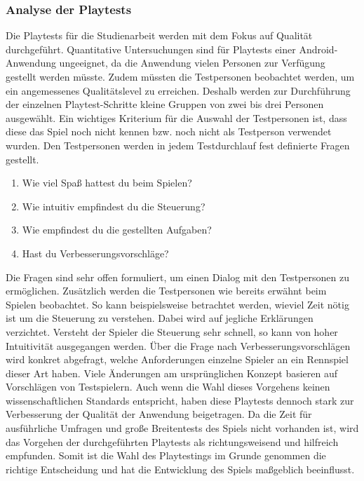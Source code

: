 \subsubsection*{Analyse der Playtests}
Die Playtests für die Studienarbeit werden mit dem Fokus auf Qualität durchgeführt. Quantitative Untersuchungen sind für Playtests einer Android-Anwendung ungeeignet, da die Anwendung vielen Personen zur Verfügung gestellt werden müsste. Zudem müssten die Testpersonen beobachtet werden, um ein angemessenes Qualitätslevel zu erreichen. Deshalb werden zur Durchführung der einzelnen Playtest-Schritte kleine Gruppen von zwei bis drei Personen ausgewählt. Ein wichtiges Kriterium für die Auswahl der Testpersonen ist, dass diese das Spiel noch nicht kennen bzw. noch nicht als Testperson verwendet wurden.
Den Testpersonen werden in jedem Testdurchlauf fest definierte Fragen gestellt.
\begin{enumerate}
    \item{Wie viel Spaß hattest du beim Spielen?}
    \item{Wie intuitiv empfindest du die Steuerung?}
    \item{Wie empfindest du die gestellten Aufgaben?}
    \item{Hast du Verbesserungsvorschläge?}
\end{enumerate}
Die Fragen sind sehr offen formuliert, um einen Dialog mit den Testpersonen zu ermöglichen. Zusätzlich werden die Testpersonen wie bereits erwähnt beim Spielen beobachtet. So kann beispielsweise betrachtet werden, wieviel Zeit nötig ist um die Steuerung zu verstehen. Dabei wird auf jegliche Erklärungen verzichtet. Versteht der Spieler die Steuerung sehr schnell, so kann von hoher Intuitivität ausgegangen werden. Über die Frage nach Verbesserungsvorschlägen wird konkret abgefragt, welche Anforderungen einzelne Spieler an ein Rennspiel dieser Art haben. Viele Änderungen am ursprünglichen Konzept basieren auf Vorschlägen von Testspielern.
Auch wenn die Wahl dieses Vorgehens keinen wissenschaftlichen Standards entspricht, haben diese Playtests dennoch stark zur Verbesserung der Qualität der Anwendung beigetragen. Da die Zeit für ausführliche Umfragen und große Breitentests des Spiels nicht vorhanden ist, wird das Vorgehen der durchgeführten Playtests als richtungsweisend und hilfreich empfunden. Somit ist die Wahl des Playtestings im Grunde genommen die richtige Entscheidung und hat die Entwicklung des Spiels maßgeblich beeinflusst.

